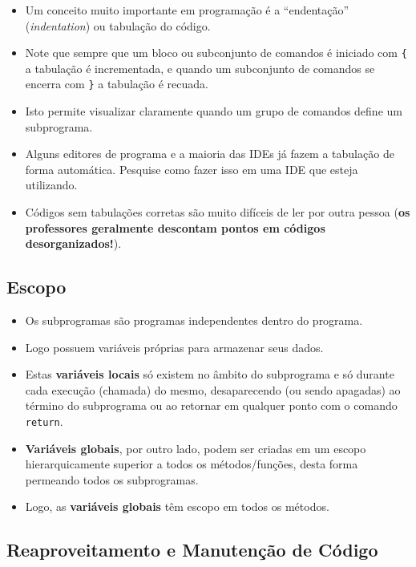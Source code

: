 \documentclass[12pt,a4paper]{article}
\begin{document}
    \begin{itemize}
\item
  Um conceito muito importante em programação é a ``endentação''
  (\emph{indentation}) ou tabulação do código.
\item
  Note que sempre que um bloco ou subconjunto de comandos é iniciado com
  \texttt{\{} a tabulação é incrementada, e quando um subconjunto de
  comandos se encerra com \texttt{\}} a tabulação é recuada.
\item
  Isto permite visualizar claramente quando um grupo de comandos define
  um subprograma.
\item
  Alguns editores de programa e a maioria das IDEs já fazem a tabulação
  de forma automática. Pesquise como fazer isso em uma IDE que esteja
  utilizando.
\item
  Códigos sem tabulações corretas são muito difíceis de ler por outra
  pessoa (\textbf{os professores geralmente descontam pontos em códigos
  desorganizados!}).
\end{itemize}

    \hypertarget{escopo}{%
\subsection{Escopo}\label{escopo}}

    \begin{itemize}
\item
  Os subprogramas são programas independentes dentro do programa.
\item
  Logo possuem variáveis próprias para armazenar seus dados.
\item
  Estas \textbf{variáveis locais} só existem no âmbito do subprograma e
  só durante cada execução (chamada) do mesmo, desaparecendo (ou sendo
  apagadas) ao término do subprograma ou ao retornar em qualquer ponto
  com o comando \texttt{return}.
\item
  \textbf{Variáveis globais}, por outro lado, podem ser criadas em um
  escopo hierarquicamente superior a todos os métodos/funções, desta
  forma permeando todos os subprogramas.
\item
  Logo, as \textbf{variáveis globais} têm escopo em todos os métodos.
\end{itemize}

    \hypertarget{reaproveitamento-e-manutenuxe7uxe3o-de-cuxf3digo}{%
\subsection{Reaproveitamento e Manutenção de
Código}\label{reaproveitamento-e-manutenuxe7uxe3o-de-cuxf3digo}}
\end{document}
